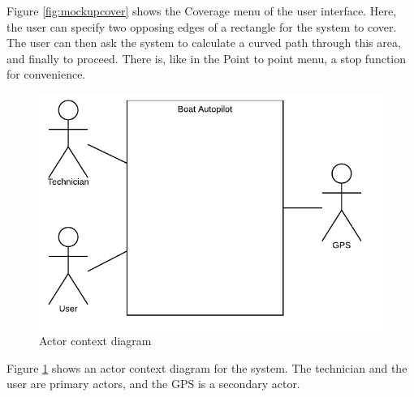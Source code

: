Figure \ref{fig:mockupcover} shows the Coverage menu of the user interface. Here, the user can specify two opposing edges of a rectangle for the system to cover. The user can then ask the system to calculate a curved path through this area, and finally to proceed. There is, like in the Point to point menu, a stop function for convenience.

\begin{figure}[H]
	\centering
	\includegraphics{Images/Requirements_specification/Actor_context_diagram}
	\caption{Actor context diagram}
	\label{fig:actorcontextdiagram}
\end{figure}

Figure \ref{fig:actorcontextdiagram} shows an actor context diagram for the system. The technician and the user are primary actors, and the GPS is a secondary actor.


